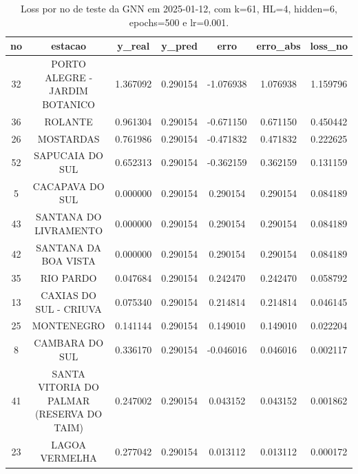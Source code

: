 \begin{table}[h]
\centering
\caption{Loss por no de teste da GNN em 2025-01-12, com k=61, HL=4, hidden=6, epochs=500 e lr=0.001.}
\label{tab:gnn_loss_k61_hl4_h6_e500_d20250112}
\begin{tabular}{ccccccc}
\toprule
no & estacao & y\_real & y\_pred & erro & erro\_abs & loss\_no \\
\midrule
32 & PORTO ALEGRE - JARDIM BOTANICO & 1.367092 & 0.290154 & -1.076938 & 1.076938 & 1.159796 \\
36 & ROLANTE & 0.961304 & 0.290154 & -0.671150 & 0.671150 & 0.450442 \\
26 & MOSTARDAS & 0.761986 & 0.290154 & -0.471832 & 0.471832 & 0.222625 \\
52 & SAPUCAIA DO SUL & 0.652313 & 0.290154 & -0.362159 & 0.362159 & 0.131159 \\
5 & CACAPAVA DO SUL & 0.000000 & 0.290154 & 0.290154 & 0.290154 & 0.084189 \\
43 & SANTANA DO LIVRAMENTO & 0.000000 & 0.290154 & 0.290154 & 0.290154 & 0.084189 \\
42 & SANTANA DA BOA VISTA & 0.000000 & 0.290154 & 0.290154 & 0.290154 & 0.084189 \\
35 & RIO PARDO & 0.047684 & 0.290154 & 0.242470 & 0.242470 & 0.058792 \\
13 & CAXIAS DO SUL - CRIUVA & 0.075340 & 0.290154 & 0.214814 & 0.214814 & 0.046145 \\
25 & MONTENEGRO & 0.141144 & 0.290154 & 0.149010 & 0.149010 & 0.022204 \\
8 & CAMBARA DO SUL & 0.336170 & 0.290154 & -0.046016 & 0.046016 & 0.002117 \\
41 & SANTA VITORIA DO PALMAR (RESERVA DO TAIM) & 0.247002 & 0.290154 & 0.043152 & 0.043152 & 0.001862 \\
23 & LAGOA VERMELHA & 0.277042 & 0.290154 & 0.013112 & 0.013112 & 0.000172 \\
\bottomrule
\end{tabular}
\end{table}
